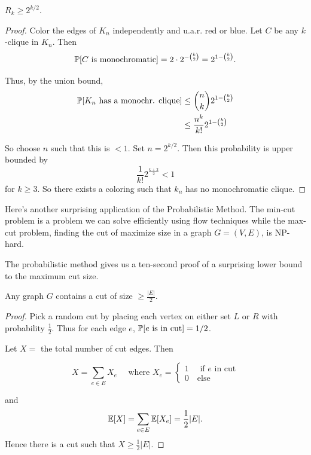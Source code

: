 \documentclass[11 pt]{scrartcl}
\begin{document}
\begin{theorem}
    $R_k \geq 2^{k/2}$. 
\end{theorem}
\begin{proof}
    Color the edges of $K_n$ independently and u.a.r. red or blue. Let $C$ be any $k$-clique in $K_n$. Then 
    \[ \mathbb P[C\text{ is monochromatic}] = 2\cdot 2^{-\binom{k}{2}} = 2^{1-\binom{k}{2}}.\] 

    Thus, by the union bound, 
    \begin{align*}
        \mathbb P[K_n \text{ has a monochr. clique}]  &\leq \binom{n}{k} 2^{1-\binom{k}{2}}  \\ 
                                                &\leq \dfrac{n^k}{k!} 2^{1-\binom{k}{2}}
    \end{align*}

    So choose $n$ such that this is $<1$. Set $n = 2^{k/2}$. Then this probability is upper bounded by 
    \[ \dfrac{1}{k!}2^{\frac{k+2}{2}} < 1 \] 
    for $k \geq 3$. So there exists a coloring such that $k_n$ has no monochromatic clique.
\end{proof}

Here's another surprising application of the Probabilistic Method. The min-cut problem is a problem we can solve efficiently using flow techniques while the max-cut problem, finding the cut of maximize size in a graph $G = (V, E)$, is NP-hard. 

The probabilistic method gives us a ten-second proof of a surprising lower bound to the maximum cut size. 
\begin{theorem}
    Any graph $G$ contains a cut of size $\geq \frac{|E|}{2}$. 
\end{theorem}
\begin{proof}
    Pick a random cut by placing each vertex on either set $L$ or $R$ with probability $\frac 12$. Thus for each edge $e$, $\mathbb P[e\text{ is in cut}] = 1/2$. 

    Let $X = $ the total number of cut edges. Then 

    \[ X = \sum_{e\in E} X_e \quad \text{ where } X_e = \begin{cases} 1 \quad \text{ if } e \text{ in cut} \\ 0 \quad \text{else}\end{cases}\]

    and 
    \[ \mathbb E[X] = \sum_{e\in E} \mathbb E[X_e] = \frac{1}{2}|E|.\]
    Hence there is a cut such that $X \geq \frac{1}{2} |E|$. 
\end{proof}
\end{document}
